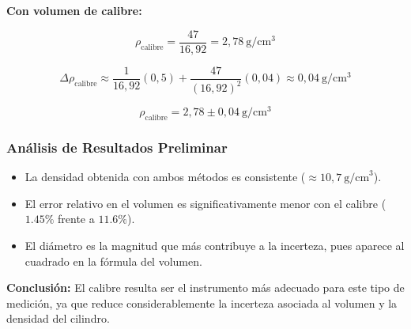 \textbf{Con volumen de calibre:}

\[
\rho_{\text{calibre}} = \frac{47}{16{,}92} = 2{,}78\ \mathrm{g/cm^3}
\]

\[
\Delta \rho_{\text{calibre}} \approx \frac{1}{16{,}92}(0{,}5) + \frac{47}{(16{,}92)^2}(0{,}04) \approx 0{,}04\ \mathrm{g/cm^3}
\]

\[
\rho_{\text{calibre}} = 2{,}78 \pm 0{,}04\ \mathrm{g/cm^3}
\]

\subsubsection{Análisis de Resultados Preliminar}

\begin{itemize}
    \item La densidad obtenida con ambos métodos es consistente ($\approx 10{,}7\ \text{g/cm}^3$).
    
    \item El error relativo en el volumen es significativamente menor con el calibre ($1.45\%$ frente a $11.6\%$).
    
    \item El diámetro es la magnitud que más contribuye a la incerteza, pues aparece al cuadrado en la fórmula del volumen.
\end{itemize}

\textbf{Conclusión:} El calibre resulta ser el instrumento más adecuado para este tipo de medición, ya que reduce considerablemente la incerteza asociada al volumen y la densidad del cilindro.


